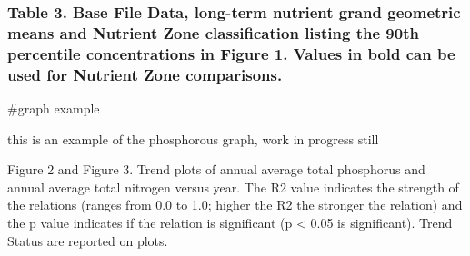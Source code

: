 \documentclass[
]{article}
\begin{document}
\hypertarget{table-3.-base-file-data-long-term-nutrient-grand-geometric-means-and-nutrient-zone-classification-listing-the-90th-percentile-concentrations-in-figure-1.-values-in-bold-can-be-used-for-nutrient-zone-comparisons.}{%
\subsubsection{Table 3. Base File Data, long-term nutrient grand
geometric means and Nutrient Zone classification listing the 90th
percentile concentrations in Figure 1. Values in bold can be used for
Nutrient Zone
comparisons.}\label{table-3.-base-file-data-long-term-nutrient-grand-geometric-means-and-nutrient-zone-classification-listing-the-90th-percentile-concentrations-in-figure-1.-values-in-bold-can-be-used-for-nutrient-zone-comparisons.}}

\#graph example

this is an example of the phosphorous graph, work in progress still

Figure 2 and Figure 3. Trend plots of annual average total phosphorus
and annual average total nitrogen versus year. The R2 value indicates
the strength of the relations (ranges from 0.0 to 1.0; higher the R2 the
stronger the relation) and the p value indicates if the relation is
significant (p \textless{} 0.05 is significant). Trend Status are
reported on plots.
\end{document}
